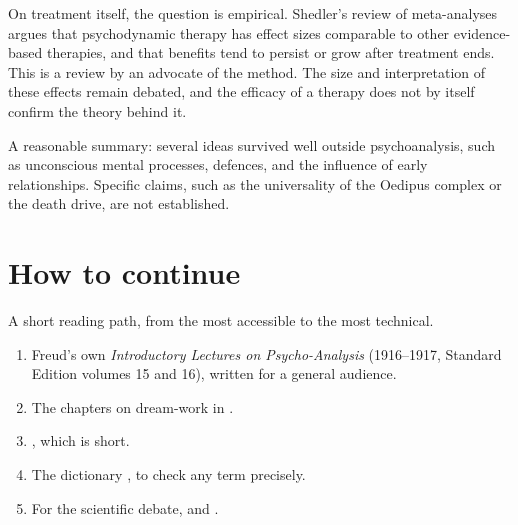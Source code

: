 On treatment itself, the question is
empirical. Shedler's review of
meta-analyses
\cite{shedler-efficacy-2010} argues that
psychodynamic therapy has effect sizes
comparable to other evidence-based
therapies, and that benefits tend to
persist or grow after treatment ends.
This is a review by an advocate of the
method. The size and interpretation of
these effects remain debated, and the
efficacy of a therapy does not by
itself confirm the theory behind it.

A reasonable summary: several ideas
survived well outside psychoanalysis,
such as unconscious mental processes,
defences, and the influence of early
relationships. Specific claims, such as
the universality of the Oedipus complex
or the death drive, are not
established.

\section{How to continue}
\label{section-psychoanalysis-continue}

A short reading path, from the most
accessible to the most technical.

\begin{enumerate}
\item Freud's own \emph{Introductory
Lectures on Psycho-Analysis}
(1916--1917, Standard Edition volumes
15 and 16), written for a general
audience.
\item The chapters on dream-work in
\cite{freud-se-4-5-dreams}.
\item \cite{freud-se-19-ego-id}, which
is short.
\item The dictionary
\cite{laplanche-pontalis-language}, to
check any term precisely.
\item For the scientific debate,
\cite{grunbaum-foundations} and
\cite{shedler-efficacy-2010}.
\end{enumerate}





